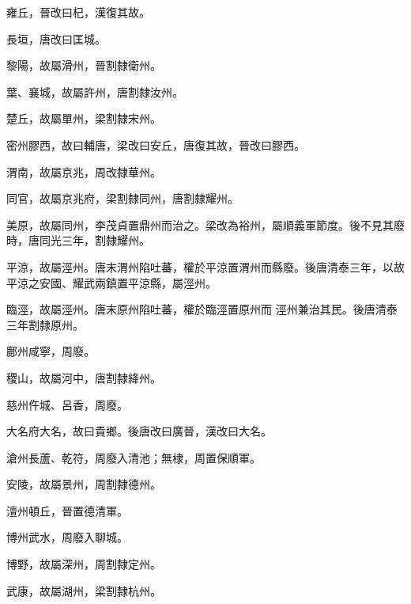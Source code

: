 \begin{pinyinscope}
 雍丘，晉改曰杞，漢復其故。



 長垣，唐改曰匡城。



 黎陽，故屬滑州，晉割隸衛州。



 葉、襄城，故屬許州，唐割隸汝州。



 楚丘，故屬單州，梁割隸宋州。



 密州膠西，故曰輔唐，梁改曰安丘，唐復其故，晉改曰膠西。



 渭南，故屬京兆，周改隸華州。



 同官，故屬京兆府，梁割隸同州，唐割隸耀州。



 美原，故屬同州，李茂貞置鼎州而治之。梁改為裕州，屬順義軍節度。後不見其廢時，唐同光三年，割隸耀州。



 平涼，故屬涇州。唐末渭州陷吐蕃，權於平涼置渭州而縣廢。後唐清泰三年，以故平涼之安國、耀武兩鎮置平涼縣，屬涇州。



 臨涇，故屬涇州。唐末原州陷吐蕃，權於臨涇置原州而
 涇州兼治其民。後唐清泰三年割隸原州。



 鄜州咸寧，周廢。



 稷山，故屬河中，唐割隸絳州。



 慈州仵城、呂香，周廢。



 大名府大名，故曰貴鄉。後唐改曰廣晉，漢改曰大名。



 滄州長蘆、乾符，周廢入清池；無棣，周置保順軍。



 安陵，故屬景州，周割隸德州。



 澶州頓丘，晉置德清軍。



 博州武水，周廢入聊城。



 博野，故屬深州，周割隸定州。



 武康，故屬湖州，梁割隸杭州。




\end{pinyinscope}
